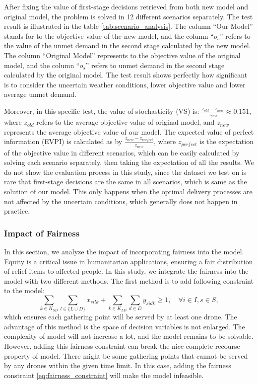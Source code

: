 \documentclass[preprint,review,11pt,authoryear]{elsarticle}
\begin{document}
After fixing the value of first-stage decisions retrieved from both new model and original model, the problem is solved in 12 different scenarios separately. The test result is illustrated in the table \ref{tab:scenario_analysis}. The column ``Our Model'' stands for to the objective value of the new model, and the column ``$o_s$'' refers to the value of the unmet demand in the second stage calculated by the new model. The column ``Original Model'' represents to the objective value of the original model, and the column ``$o_s$'' refers to unmet demand in the second stage calculated by the original model. The test result shows perfectly how significant is to consider the uncertain weather conditions, lower objective value and lower average unmet demand. 

Moreover, in this specific test, the value of stochasticity (VS) is: $\frac{z_{old} - z_{new}}{z_{new}} \approx 0.151$, where $z_{old}$ refers to the average objective value of original model, and $z_{new}$ represents the average objective value of our model. The expected value of perfect information (EVPI) is calculated as by $\frac{z_{new} - z_{perfect}}{z_{new}}$, where $z_{perfect}$ is the expectation of the objective value in different scenarios, which can be easily calculated by solving each scenario separately, then taking the expectation of all the results. We do not show the evaluation process in this study, since the dataset we test on is rare that first-stage decisions are the same in all scenarios, which is same as the solution of our model. This only happens when the optimal delivery processes are not affected by the uncertain conditions, which generally does not happen in practice. 

\subsubsection{Impact of Fairness} \label{subsubset:fairness}
In this section, we analyze the impact of incorporating fairness into the model. Equity is a critical issue in humanitarian applications, ensuring a fair distribution of relief items to affected people. In this study, we integrate the fairness into the model with two different methods. The first method is to add following constraint to the model:
\begin{equation}
    \sum_{k \in K_{SD}} \sum_{l \in \{L \cup D\}} x_{silk} +  \sum_{k \in K_{LD}} \sum_{d \in D} y_{sidk}\geq 1, \quad \forall i \in I, s \in S,
    \label{eq:fairness_constraint}
\end{equation}
which ensures each gathering point will be served by at least one drone. The advantage of this method is the space of decision variables is not enlarged. The complexity of model will not increase a lot, and the model remains to be solvable. However, adding this fairness constraint can break the nice complete recourse property of model. There might be some gathering points that cannot be served by any drones within the given time limit. In this case, adding the fairness constraint \ref{eq:fairness_constraint} will make the model infeasible.
\end{document}
